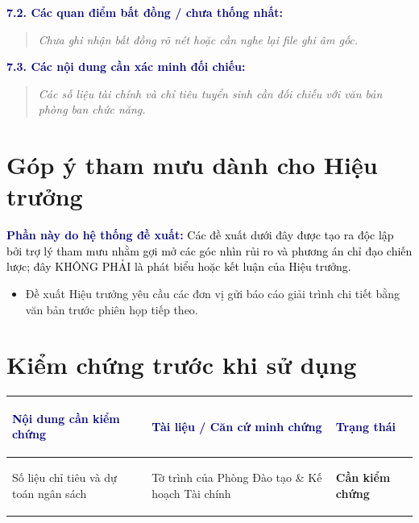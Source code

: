 \documentclass[11pt,a4paper]{article}
\newcommand{\notice}[2]{%
  \vspace{4pt}%
  \noindent\colorbox{light}{%
    \parbox{\dimexpr\textwidth-2\fboxsep\relax}{%
      \vspace{2pt}%
      \small\textbf{\textcolor{navy}{#1:}} \textcolor{black}{#2}%
      \vspace{2pt}%
    }%
  }%
  \vspace{4pt}%
}
\begin{document}
\textbf{\textcolor{navy}{7.2. Các quan điểm bất đồng / chưa thống nhất:}}
\begin{quote}
  \textit{ Chưa ghi nhận bất đồng rõ nét hoặc cần nghe lại file ghi âm gốc. }
\end{quote}

\textbf{\textcolor{navy}{7.3. Các nội dung cần xác minh đối chiếu:}}
\begin{quote}
  \textit{ Các số liệu tài chính và chỉ tiêu tuyển sinh cần đối chiếu với văn bản phòng ban chức năng. }
\end{quote}

\section{Góp ý tham mưu dành cho Hiệu trưởng}

\notice{Phần này do hệ thống đề xuất}{Các đề xuất dưới đây được tạo ra độc lập bởi trợ lý tham mưu nhằm gợi mở các góc nhìn rủi ro và phương án chỉ đạo chiến lược; đây KHÔNG PHẢI là phát biểu hoặc kết luận của Hiệu trưởng.}

\begin{itemize}[leftmargin=1.5em, itemsep=4pt]
  \item Đề xuất Hiệu trưởng yêu cầu các đơn vị gửi báo cáo giải trình chi tiết bằng văn bản trước phiên họp tiếp theo.
\end{itemize}

\section{Kiểm chứng trước khi sử dụng}

\begin{tabularx}{\textwidth}{@{}>{\bfseries\raggedright\arraybackslash}p{4cm} >{\raggedright\arraybackslash}X >{\centering\arraybackslash}p{3cm}@{}}
  \toprule
  \rowcolor{light}
  \textcolor{navy}{Nội dung cần kiểm chứng} & \textcolor{navy}{Tài liệu / Căn cứ minh chứng} & \textcolor{navy}{Trạng thái} \\
  \midrule
  Số liệu chỉ tiêu và dự toán ngân sách & Tờ trình của Phòng Đào tạo \& Kế hoạch Tài chính & \textbf{Cần kiểm chứng} \\
  \midrule
  \bottomrule
\end{tabularx}
\end{document}
